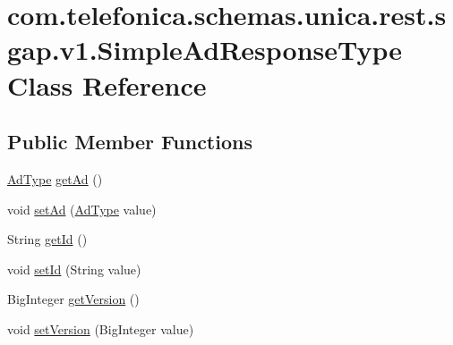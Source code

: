 \hypertarget{classcom_1_1telefonica_1_1schemas_1_1unica_1_1rest_1_1sgap_1_1v1_1_1SimpleAdResponseType}{
\section{com.telefonica.schemas.unica.rest.sgap.v1.SimpleAdResponseType Class Reference}
\label{classcom_1_1telefonica_1_1schemas_1_1unica_1_1rest_1_1sgap_1_1v1_1_1SimpleAdResponseType}
}
\subsection*{Public Member Functions}
\begin{DoxyCompactItemize}
\item 
\hyperlink{classcom_1_1telefonica_1_1schemas_1_1unica_1_1rest_1_1sgap_1_1v1_1_1AdType}{AdType} \hyperlink{classcom_1_1telefonica_1_1schemas_1_1unica_1_1rest_1_1sgap_1_1v1_1_1SimpleAdResponseType_a2cf42397b509a03880656531b53fe246}{getAd} ()
\item 
void \hyperlink{classcom_1_1telefonica_1_1schemas_1_1unica_1_1rest_1_1sgap_1_1v1_1_1SimpleAdResponseType_a618a5cf149be0e936f13837474f4bab0}{setAd} (\hyperlink{classcom_1_1telefonica_1_1schemas_1_1unica_1_1rest_1_1sgap_1_1v1_1_1AdType}{AdType} value)
\item 
String \hyperlink{classcom_1_1telefonica_1_1schemas_1_1unica_1_1rest_1_1sgap_1_1v1_1_1SimpleAdResponseType_ab166368106eafe3ac0fc54d308bf3bbd}{getId} ()
\item 
void \hyperlink{classcom_1_1telefonica_1_1schemas_1_1unica_1_1rest_1_1sgap_1_1v1_1_1SimpleAdResponseType_addf768c7be467a2670ea817e56461489}{setId} (String value)
\item 
BigInteger \hyperlink{classcom_1_1telefonica_1_1schemas_1_1unica_1_1rest_1_1sgap_1_1v1_1_1SimpleAdResponseType_ae857614e7821718135871f89b36d3214}{getVersion} ()
\item 
void \hyperlink{classcom_1_1telefonica_1_1schemas_1_1unica_1_1rest_1_1sgap_1_1v1_1_1SimpleAdResponseType_a699ab1cd4b5accb19763af89dd2847c8}{setVersion} (BigInteger value)
\end{DoxyCompactItemize}
